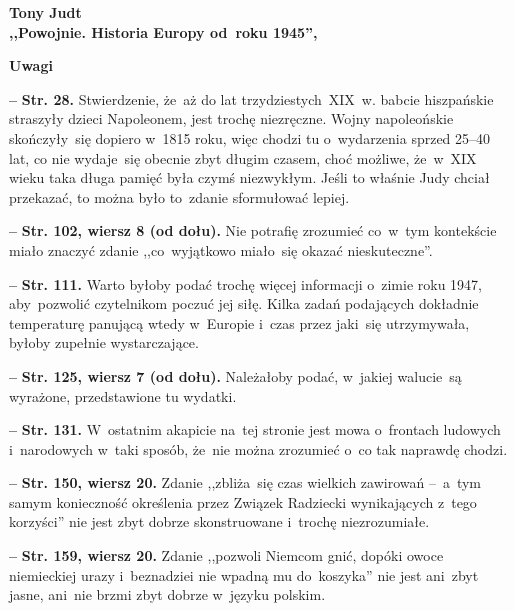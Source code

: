 \documentclass[a4paper,11pt]{article}  %
\newcommand{\spaceFour}{0.5em}
\newcommand{\tb}{\textbf}
\newcommand{\noi}{\noindent}
\newcommand{\start}{\noi \tb{--} {}}
\newcommand{\Str}[1]{\tb{Str. #1.}}
\newcommand{\StrWg}[2]{\tb{Str. #1, wiersz #2.}}
\newcommand{\StrWd}[2]{\tb{Str. #1, wiersz #2 (od dołu).}}
\newcommand{\Center}[1]{\begin{center} #1 \end{center}}
\newcommand{\CenterTB}[1]{\Center{\tb{#1}}}
\newcommand{\Work}[1]{ \begin{center} {\large \tb{#1}} \end{center} }
\begin{document}
\Work{
  Tony Judt \\
  ,,Powojnie. Historia Europy od~roku 1945'', \cite{JudtPowojnie16} }


\CenterTB{Uwagi}

\start \Str{28} Stwierdzenie, że~aż do lat trzydziestych~XIX~w. babcie
hiszpańskie straszyły dzieci Napoleonem, jest trochę niezręczne. Wojny
napoleońskie skończyły~się dopiero w~1815 roku, więc chodzi tu
o~wydarzenia sprzed 25--40 lat, co nie wydaje~się obecnie zbyt długim
czasem, choć możliwe, że~w~XIX wieku taka długa pamięć była czymś
niezwykłym. Jeśli to właśnie Judy chciał przekazać, to można było
to~zdanie sformułować lepiej.

\vspace{\spaceFour}


\start \StrWd{102}{8} Nie potrafię zrozumieć co~w~tym kontekście miało
znaczyć zdanie ,,co~wyjątkowo miało~się okazać nieskuteczne''.

\vspace{\spaceFour}


\start \Str{111} Warto byłoby podać trochę więcej informacji o~zimie
roku 1947, aby~pozwolić czytelnikom poczuć jej siłę. Kilka zadań
podających dokładnie temperaturę panującą wtedy w~Europie i~czas przez
jaki~się utrzymywała, byłoby zupełnie wystarczające.

\vspace{\spaceFour}


\start \StrWd{125}{7} Należałoby podać, w~jakiej walucie~są wyrażone,
przedstawione tu wydatki.

\vspace{\spaceFour}


\start \Str{131} W~ostatnim akapicie na~tej stronie jest mowa
o~frontach ludowych i~narodowych w~taki sposób, że~nie można zrozumieć
o~co tak naprawdę chodzi.

\vspace{\spaceFour}


\start \StrWg{150}{20} Zdanie ,,zbliża~się czas wielkich zawirowań
--~a~tym samym konieczność określenia przez Związek Radziecki
wynikających z~tego korzyści'' nie jest zbyt dobrze skonstruowane
i~trochę niezrozumiałe.

\vspace{\spaceFour}


\start \StrWg{159}{20} Zdanie ,,pozwoli Niemcom gnić, dopóki owoce
niemieckiej urazy i~beznadziei nie wpadną mu do~koszyka'' nie jest
ani~zbyt jasne, ani~nie brzmi zbyt dobrze w~języku polskim.
\end{document}
